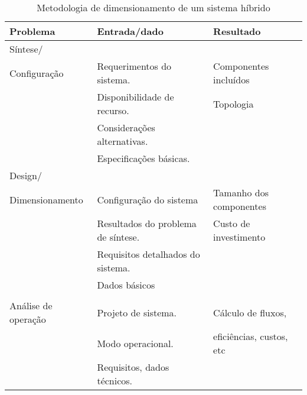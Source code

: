 
\begin{table}[ht]
 \centering
 \caption{Metodologia de dimensionamento de um sistema híbrido}\label{tbl:metodo}
  \begin{tabular}{l l l}
   \hline
   Problema  & Entrada/dado  & Resultado          \\
   \hline
   \hline
   Síntese/                &                                                 &                                         \\
   Configuração            & Requerimentos do sistema.                       &       Componentes       incluídos       \\
                           & Disponibilidade de recurso.                     & Topologia                               \\
                           & Considerações alternativas.                     &                                         \\
                           & Especificações básicas.                         &                                         \\
   Design/                 &                                                 &                                         \\
   Dimensionamento         & Configuração do sistema                         & Tamanho       dos      componentes      \\
                           & Resultados do problema de síntese.              &  Custo de investimento                  \\
                           & Requisitos detalhados do sistema.               &                                         \\
                           & Dados básicos                                   &                                         \\
                           &                                                 &                                         \\
   Análise de operação     & Projeto de sistema.                             & Cálculo de fluxos,                      \\
                           & Modo operacional.                               & eficiências, custos, etc                \\
                           & Requisitos, dados técnicos.                     &                                         \\

\end{tabular}
\end{table}

